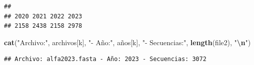 \documentclass[
]{article}
\newenvironment{Shaded}{\begin{snugshade}}{\end{snugshade}}
\newcommand{\FunctionTok}[1]{\textcolor[rgb]{0.13,0.29,0.53}{\textbf{#1}}}
\newcommand{\NormalTok}[1]{#1}
\newcommand{\SpecialCharTok}[1]{\textcolor[rgb]{0.81,0.36,0.00}{\textbf{#1}}}
\newcommand{\StringTok}[1]{\textcolor[rgb]{0.31,0.60,0.02}{#1}}
\begin{document}
\begin{Shaded}
\end{Shaded}

\begin{verbatim}
## 
## 2020 2021 2022 2023 
## 2158 2438 2158 2978
\end{verbatim}

\begin{Shaded}
\begin{Highlighting}[]
\FunctionTok{cat}\NormalTok{(}\StringTok{"Archivo:"}\NormalTok{, archivos[k], }\StringTok{"{-} Año:"}\NormalTok{, años[k], }\StringTok{"{-} Secuencias:"}\NormalTok{, }\FunctionTok{length}\NormalTok{(file2), }\StringTok{"}\SpecialCharTok{\textbackslash{}n}\StringTok{"}\NormalTok{)}
\end{Highlighting}
\end{Shaded}

\begin{verbatim}
## Archivo: alfa2023.fasta - Año: 2023 - Secuencias: 3072
\end{verbatim}
\end{document}
